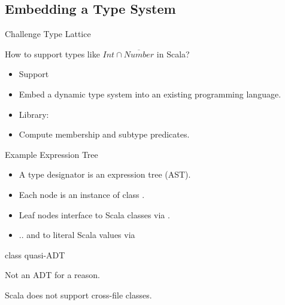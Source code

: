 \subsection{Embedding a Type System}

{  
\begin{frame}{Challenge }{Type Lattice}

  How to support types like $Int\cap\overline{Number}$ in Scala?

  \begin{itemize}
  \item   Support 
  \item Embed a dynamic type system into an existing programming language.
  \item Library: 
  \item Compute membership and subtype predicates.
  \end{itemize}

\end{frame}
}



\newsavebox\tdast
\begin{lrbox}{\tdast}
  \begin{minipage}{11cm}
    
  \end{minipage}
\end{lrbox}


\begin{frame}{Example  Expression Tree}
  \usebox\tdast

  \medskip

  \centering

  \scalebox{0.7}{}
  \begin{itemize}
  \item A type designator is an expression tree (AST).
  \item Each node is an instance of class .
  \item Leaf nodes interface to Scala classes via .
  \item .. and to literal Scala values via 
  \end{itemize}
\end{frame}


\begin{frame}{ class quasi-ADT}
  \scalebox{0.9}{}

  \medskip

  Not an ADT for a  reason.

  Scala does not support cross-file  classes.
\end{frame}


